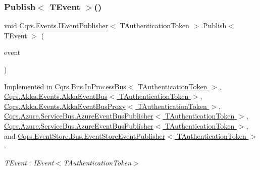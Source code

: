 \subsubsection{\texorpdfstring{Publish$<$ T\+Event $>$()}{Publish< TEvent >()}\hspace{0.1cm}{\footnotesize\ttfamily [1/2]}}
{\footnotesize\ttfamily void \hyperlink{interfaceCqrs_1_1Events_1_1IEventPublisher}{Cqrs.\+Events.\+I\+Event\+Publisher}$<$ T\+Authentication\+Token $>$.Publish$<$ T\+Event $>$ (\begin{DoxyParamCaption}\item[{T\+Event @}]{event }\end{DoxyParamCaption})}



Implemented in \hyperlink{classCqrs_1_1Bus_1_1InProcessBus_afd3d41a5f27a985e9d6ccf3f6f77f11a}{Cqrs.\+Bus.\+In\+Process\+Bus$<$ T\+Authentication\+Token $>$}, \hyperlink{classCqrs_1_1Akka_1_1Events_1_1AkkaEventBus_aaba5d37020e21d03cc2bbc3da14f45ea}{Cqrs.\+Akka.\+Events.\+Akka\+Event\+Bus$<$ T\+Authentication\+Token $>$}, \hyperlink{classCqrs_1_1Akka_1_1Events_1_1AkkaEventBusProxy_a656daead2fe6f30487855dbaea5a3c83}{Cqrs.\+Akka.\+Events.\+Akka\+Event\+Bus\+Proxy$<$ T\+Authentication\+Token $>$}, \hyperlink{classCqrs_1_1Azure_1_1ServiceBus_1_1AzureEventBusPublisher_a175365f8217cfe163ffadc891f0cd3e3}{Cqrs.\+Azure.\+Service\+Bus.\+Azure\+Event\+Bus\+Publisher$<$ T\+Authentication\+Token $>$}, \hyperlink{classCqrs_1_1Azure_1_1ServiceBus_1_1AzureEventBusPublisher_a175365f8217cfe163ffadc891f0cd3e3}{Cqrs.\+Azure.\+Service\+Bus.\+Azure\+Event\+Bus\+Publisher$<$ T\+Authentication\+Token $>$}, and \hyperlink{classCqrs_1_1EventStore_1_1Bus_1_1EventStoreEventPublisher_a1ebb6f08648bdfd5c5bd29fcc12adfea}{Cqrs.\+Event\+Store.\+Bus.\+Event\+Store\+Event\+Publisher$<$ T\+Authentication\+Token $>$}.

\begin{Desc}
\item[Type Constraints]\begin{description}
\item[{\em T\+Event} : {\em I\+Event$<$T\+Authentication\+Token$>$}]\end{description}
\end{Desc}
\mbox{\label{interfaceCqrs_1_1Events_1_1IEventPublisher_a2cbcc3d2c24d015abef6337714ec51ff}} 
